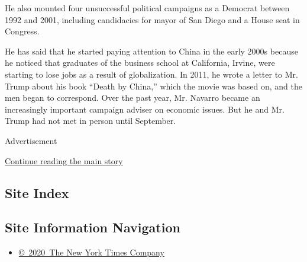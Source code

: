 He also mounted four unsuccessful political campaigns as a Democrat
between 1992 and 2001, including candidacies for mayor of San Diego and
a House seat in Congress.

He has said that he started paying attention to China in the early 2000s
because he noticed that graduates of the business school at California,
Irvine, were starting to lose jobs as a result of globalization. In
2011, he wrote a letter to Mr. Trump about his book ``Death by China,''
which the movie was based on, and the men began to correspond. Over the
past year, Mr. Navarro became an increasingly important campaign adviser
on economic issues. But he and Mr. Trump had not met in person until
September.

Advertisement

\protect\hyperlink{after-bottom}{Continue reading the main story}

\hypertarget{site-index}{%
\subsection{Site Index}\label{site-index}}

\hypertarget{site-information-navigation}{%
\subsection{Site Information
Navigation}\label{site-information-navigation}}

\begin{itemize}
\tightlist
\item
  \href{https://help.nytimes3xbfgragh.onion/hc/en-us/articles/115014792127-Copyright-notice}{©~2020~The
  New York Times Company}
\end{itemize}

